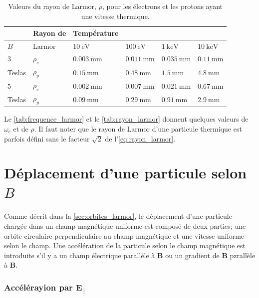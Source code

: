 \documentclass[main.tex]{subfiles}
\begin{document}
\begin{table}
	\centering
	\begin{tabular}{l l l l l l}
	\hline
	 &Rayon de & Température & & & \\
	 \hline
	 \( B \) & Larmor & \( \SI{10}{\electronvolt} \) & \( \SI{100}{\electronvolt} \) & \( \SI{1}{\kilo\electronvolt} \) & \( \SI{10}{\kilo\electronvolt} \)\\
	 \hline
	 \( 3 \) & \( \rho_e \) & \( \SI{0.003}{\milli\meter} \) & \( \SI{0.011}{\milli\meter} \) & \( \SI{0.035}{\milli\meter} \) & \( \SI{0.11}{\milli\meter} \)\\
	 Teslas  & \( \rho_p \) & \( \SI{0.15}{\milli\meter} \) & \( \SI{0.48}{\milli\meter} \) & \( \SI{1.5}{\milli\meter} \) & \( \SI{4.8}{\milli\meter} \)\\
	 \( 5 \) & \( \rho_e \) & \( \SI{0.002}{\milli\meter} \) & \( \SI{0.007}{\milli\meter} \) & \( \SI{0.021}{\milli\meter} \) & \( \SI{0.67}{\milli\meter} \)\\
	 Teslas  & \( \rho_p \) & \( \SI{0.09}{\milli\meter} \) & \( \SI{0.29}{\milli\meter} \) & \( \SI{0.91}{\milli\meter} \) & \( \SI{2.9}{\milli\meter} \)\\
	\end{tabular}
	\caption{Valeurs du rayon de Larmor, \( \rho \), pour les électrons et les protons ayant une vitesse thermique.}
	\label{tab:rayon_larmor}
\end{table}

Le \autoref{tab:frequence_larmor} et le \autoref{tab:rayon_larmor} donnent quelques valeurs de \( \omega_c \) et de \( \rho \).
Il faut noter que le rayon de Larmor d'une particule thermique est parfois défini sans le facteur \( \sqrt{2} \) de l'\autoref{eq:rayon_larmor}. 

\section{Déplacement d'une particule selon \( B \)}
\label{sec:deplacement_B}

Comme décrit dans la \autoref{sec:orbites_larmor}, le déplacement d'une particule chargée dans un champ magnétique uniforme est composé de deux parties; une orbite circulaire perpendiculaire au champ magnétique et une vitesse uniforme selon le champ.
Une accélération de la particule selon le champ magnétique est introduite s'il y a un champ électrique parallèle à \( \bm{B} \) ou un gradient de \( \bm{B} \) pzrallèle à \( \bm{B} \).

\subsubsection*{Accélérayion par \( \bm{E}_\parallel \)}
\end{document}
